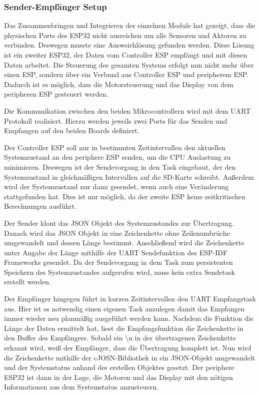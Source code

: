 \subsubsection{Sender-Empfänger Setup}

Das Zusammenbringen und Integrieren der einzelnen Module hat gezeigt, dass die physischen Ports des ESP32 nicht ausreichen um alle Sensoren und Aktoren zu verbinden.
Deswegen musste eine Ausweichlösung gefunden werden.
Diese Lösung ist ein zweiter ESP32, der Daten vom Controller ESP empfängt und mit diesen Daten arbeitet.
Die Steuerung des gesamten Systems erfolgt nun nicht mehr über einen ESP, sondern über ein Verbund aus Controller ESP und peripherem ESP.
Dadurch ist es möglich, dass die Motorsteuerung und das Display von dem peripheren ESP gesteuert werden.

Die Kommunikation zwischen den beiden Mikrocontrollern wird mit dem UART Protokoll realisiert. Hierzu werden jeweils zwei Ports für das Senden und Empfangen auf den beiden Boards definiert.

Der Controller ESP soll nur in bestimmten Zeitintervallen den aktuellen Systemzustand an den periphere ESP senden, um die CPU Auslastung zu minimieren.
Deswegen ist der Sendevorgang in den Task eingebaut, der den Systemzustand in gleichmäßigen Intervallen auf die SD-Karte schreibt.
Außerdem wird der Systemzustand nur dann gesendet, wenn auch eine Veränderung stattgefunden hat.
Dies ist nur möglich, da der zweite ESP keine zeitkritischen Berechnungen ausführt.

Der Sender klont das JSON Objekt des Systemzustandes zur Übertragung.
Danach wird das JSON Objekt in eine Zeichenkette ohne Zeilenumbrüche umgewandelt und dessen Länge bestimmt.
Anschließend wird die Zeichenkette unter Angabe der Länge mithilfe der UART Sendefunktion des ESP-IDF Frameworks gesendet.
Da der Sendevorgang in dem Task zum persistenten Speichern des Systemzustandes aufgerufen wird, muss kein extra Sendetask erstellt werden.

Der Empfänger hingegen führt in kurzen Zeitintervallen den UART Empfangstask aus. Hier ist es notwendig einen eigenen Task anzulegen damit das Empfangen immer wieder neu planmäßig ausgeführt werden kann.
Nachdem die Funktion die Länge der Daten ermittelt hat, liest die Empfangsfunktion die Zeichenkette in den Buffer des Empfängers. Sobald ein \glqq \textbackslash n\grqq{} in der übertragenen Zeichenkette erkannt wird, weiß der Empfänger, dass die Übertragung komplett ist.
Nun wird die Zeichenkette mithilfe der cJOSN-Bibliothek in ein JSON-Objekt umgewandelt und der Systemstatus anhand des erstellen Objektes gesetzt.
Der periphere ESP32 ist dann in der Lage, die Motoren und das Display mit den nötigen Informationen aus dem Systemstatus anzusteuern.
